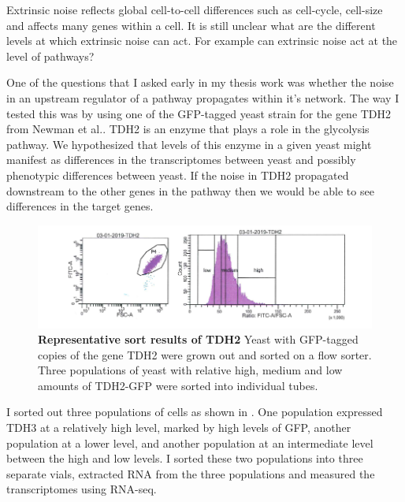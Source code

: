 Extrinsic noise reflects global cell-to-cell differences such as cell-cycle, cell-size and affects many genes within a cell. It is still unclear what are the different levels at which extrinsic noise can act. For example can extrinsic noise act at the level of pathways?

One of the questions that I asked early in my thesis work was whether the noise in an upstream regulator of a pathway propagates within it's network. The way I tested this was by using one of the GFP-tagged yeast strain for the gene TDH2 from Newman et al.\cite{newman2006na}. TDH2 is an enzyme that plays a role in the glycolysis pathway. We hypothesized that levels of this enzyme in a given yeast might manifest as differences in the transcriptomes between yeast and possibly phenotypic differences between yeast. If the noise in TDH2 propagated downstream to the other genes in the pathway then we would be able to see differences in the target genes. 

\begin{figure}[t!]  
    \centering
    \includegraphics[width=\linewidth]{figures/intro/intro_tdh2_facs.png}
    \caption[Representative sort results of TDH2]{%
        \textbf{Representative sort results of TDH2}
        Yeast with GFP-tagged copies of the gene TDH2 were grown out and sorted on a flow sorter. Three populations of yeast with relative high, medium and low amounts of TDH2-GFP were sorted into individual tubes.
    }
    \label{fig:intro3}
\end{figure}

I sorted out three populations of cells as shown in . One population expressed TDH3 at a relatively high level, marked by high levels of GFP, another population at a lower level, and another population at an intermediate level between the high and low levels.  I sorted these two populations into three separate vials, extracted RNA from the three populations and measured the transcriptomes using RNA-seq.


